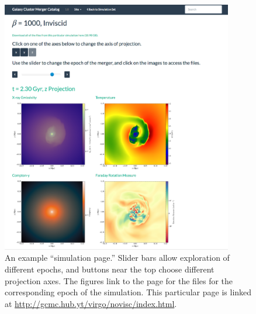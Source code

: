 \documentclass{emulateapj}
\begin{document}
\begin{figure}
\begin{center}
\includegraphics[width=0.9\textwidth]{sim_page.eps}
\caption{An example ``simulation page.'' Slider bars allow exploration of different epochs, and buttons near the top choose different projection axes. The figures link to the page for the files for the corresponding epoch of the simulation. This particular page is linked at \url{http://gcmc.hub.yt/virgo/novisc/index.html}.\label{fig:sim_page}}
\end{center}
\end{figure}
\end{document}
